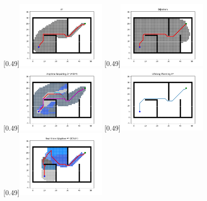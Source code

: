 \documentclass[master,academic]{ysuthesis} %
\begin{document}
		\begin{figure}[!ht]
			\centering
			[0.49\textwidth]{\includegraphics[width=0.4\textwidth]{fig/插图/A-search/Astar.png}}
			[0.49\textwidth]{\includegraphics[width=0.4\textwidth]{fig/插图/A-search/Dijstra.png}}
			[0.49\textwidth]{\includegraphics[width=0.4\textwidth]{fig/插图/A-search/ARAstar.png}}
			[0.49\textwidth]{\includegraphics[width=0.4\textwidth]{fig/插图/A-search/LPAstar.png}}
			[0.49\textwidth]{\includegraphics[width=0.4\textwidth]{fig/插图/A-search/RTAAstar.png}}

\end{figure}
\end{document}
